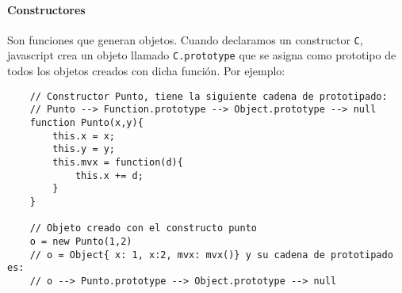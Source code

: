 \paragraph{Constructores} Son funciones que generan objetos. Cuando declaramos un constructor \texttt{C}, javascript crea un objeto llamado \texttt{C.prototype} que se asigna como prototipo de todos los objetos creados con dicha función. Por ejemplo:

\begin{centrado}
\begin{verbatim}
    // Constructor Punto, tiene la siguiente cadena de prototipado:
    // Punto --> Function.prototype --> Object.prototype --> null
    function Punto(x,y){
        this.x = x;
        this.y = y;
        this.mvx = function(d){
            this.x += d;
        }
    }
    
    // Objeto creado con el constructo punto
    o = new Punto(1,2)
    // o = Object{ x: 1, x:2, mvx: mvx()} y su cadena de prototipado es:
    // o --> Punto.prototype --> Object.prototype --> null
\end{verbatim}
\end{centrado}
